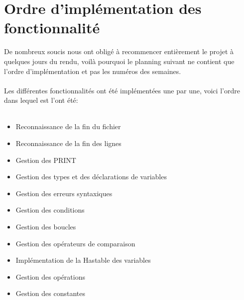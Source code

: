 \section{Ordre d'implémentation des fonctionnalité}
De nombreux soucis nous ont obligé à recommencer entièrement le projet à quelques jours du rendu, voilà pourquoi le planning suivant ne contient que l'ordre d'implémentation et pas les numéros des semaines.
\\\\
Les différentes fonctionnalités ont été implémentées une par une, voici l'ordre dans lequel est l'ont été:
\\\\
\begin{itemize}
    \item Reconnaissance de la fin du fichier
    \item Reconnaissance de la fin des lignes
    \item Gestion des PRINT
    \item Gestion des types et des déclarations de variables
    \item Gestion des erreurs syntaxiques
    \item Gestion des conditions
    \item Gestion des boucles
    \item Gestion des opérateurs de comparaison
    \item Implémentation de la Hastable des variables
    \item Gestion des opérations
    \item Gestion des constantes
\end{itemize}


